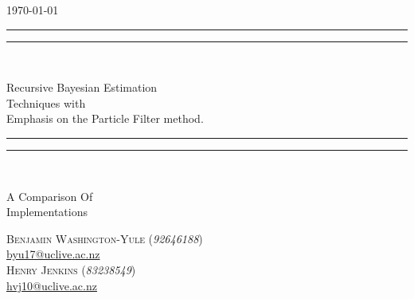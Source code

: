 \begin{titlepage}
\centering
\vspace*{\baselineskip}

\flushright\today\\
\centering
\rule{\textwidth}{1.6pt}\vspace*{-\baselineskip}\vspace*{2pt}
\rule{\textwidth}{0.4pt}\\[\baselineskip]

{\Huge \scshape

  Recursive Bayesian Estimation\\
  Techniques with\\
  Emphasis on the Particle Filter method.

}

\rule{\textwidth}{0.4pt}\vspace*{-\baselineskip}\vspace*{3.2pt}
\rule{\textwidth}{1.6pt}\\[\baselineskip]
{\scshape \large

  A Comparison Of\\
  Implementations\\

}


\vspace*{3\baselineskip}
{\Large

  {\scshape Benjamin Washington-Yule} (\emph{92646188})\\
  \url{byu17@uclive.ac.nz}\\
  \medskip\medskip
    {\scshape Henry Jenkins} (\emph{83238549})\\
    \url{hvj10@uclive.ac.nz}\\
}

\end{titlepage}
